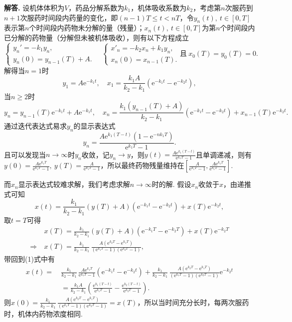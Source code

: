 \documentclass[12pt, a4paper, oneside]{ctexart}
\newenvironment{solution}[1][]{\par\noindent\textbf{#1解答. }}{\smallskip\par}  %
\let\leq=\leqslant %
\let\geq=\geqslant %
\def\e{\mathrm{e}}          %
\def\add{\vspace{1ex}}      %
\begin{document}
\begin{solution}
    设机体体积为$V$，药品分解系数为$k_1$，机体吸收系数为$k_2$，考虑第$n$次服药到$n+1$次服药时间段内药量的变化，即$(n-1)T\leq t < nT$，令$y_n(t),\ t\in[0,T]$表示第$n$个时间段内药物未分解的量（残量）；$x_n(t),\ t\in[0,T]$为第$n$个时间段内已分解的药物量（分解但未被机体吸收），则有以下方程成立
    \begin{equation*}
        \begin{cases}
            y_n' = -k_1y_n,\\
            y_n(0) = y_{n-1}(T)+A.
        \end{cases}
        \quad\begin{cases}
            x'_n=-k_2x_n+k_1y_n,\\
            x_n(0) = x_{n-1}(T).
        \end{cases}\text{且}\ x_0(T) = y_0(T) = 0.
    \end{equation*}
    解得当$n=1$时
    \begin{equation*}
        y_1 = A\e^{-k_1t},\quad x_1=\frac{k_1A}{k_2-k_1}(\e^{-k_1t}-\e^{-k_2t}),
    \end{equation*}
    当$n\geq 2$时
    \begin{equation*}
        y_n = y_{n-1}(T)\e^{-k_1t}+A\e^{-k_1t},\quad x_n=\frac{k_1(y_{n-1}(T)+A)}{k_2-k_1}(\e^{-k_1t}-\e^{-k_2t})+x_{n-1}(T)\e^{-k_2t}.
    \end{equation*}
    通过迭代表达式易求$y_n$的显示表达式
    \begin{equation*}
        y_n = \frac{A\e^{k_1(T-t)}(1-\e^{-nk_1T})}{\e^{k_1T}-1}.
    \end{equation*}
    且可以发现当$n\to\infty$时$y_n$收敛，\add 记$y_n\to y$，则$y(t) = \frac{A\e^{k_1(T-t)}}{\e^{k_1T}-1}$且单调递减，则有$y(0) = \frac{A\e^{k_1T}}{\e^{k_1T}-1},\ y(T) = \frac{A}{\e^{k_1T}-1}$，所以最终药物残量维持在$\left[\frac{A}{\e^{k_1T}-1}, \frac{A\e^{k_1T}}{\e^{k_1T}-1}\right]$.\add

    而$x_n$显示表达式较难求解，我们考虑求解$n\to\infty$时的解. 假设$x_n$收敛于$x$，由递推式可知
    \begin{equation}
        x(t)=\frac{k_1}{k_2-k_1}(y(T)+A)(\e^{-k_1t}-\e^{-k_2t})+x(T)\e^{-k_2t},
    \end{equation}
    取$t=T$可得
    \begin{align*}
        &\ x(T) = \frac{k_1}{k_2-k_1}(y(T)+A)(\e^{-k_1T}-\e^{-k_2T})+x(T)\e^{-k_2T}\\
        \Rightarrow&\ x(T) = \frac{k_1}{k_2-k_1}\,\frac{A(\e^{k_2T}-\e^{k_1T})}{(\e^{k_1T}-1)(\e^{k_2T}-1)},
    \end{align*}
    带回到(1)式中有
    \begin{align*}
        x(t) =&\ \frac{k_1}{k_2-k_1}\,\frac{A\e^{k_1T}}{\e^{k_1T}-1}(\e^{-k_1t}-\e^{-k_2t})+\frac{k_1}{k_2-k_1}\,\frac{A(\e^{k_2T}-\e^{k_1T})}{(\e^{k_1T}-1)(\e^{k_2T}-1)}\e^{-k_2t}\\
        &\ = \frac{k_1A}{k_2-k_1}\left(\frac{\e^{k_1(T-t)}}{\e^{k_1T}-1}-\frac{\e^{k_2(T-t)}}{\e^{k_2T}-1}\right).
    \end{align*}
    则$x(0) = \frac{k_1}{k_2-k_1}\,\frac{A(\e^{k_2T}-\e^{k_1T})}{(\e^{k_1T}-1)(\e^{k_2T}-1)} = x(T)$，所以当时间充分长时，每两次服药时，机体内药物浓度相同.


\end{solution}
\end{document}
